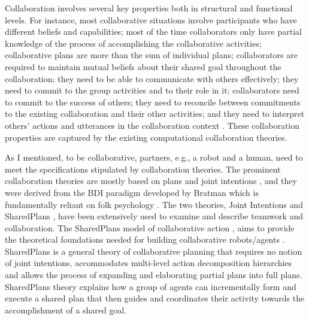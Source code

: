 \documentclass[a4paper, 10pt]{article}
\begin{document}
\begin{small}
Collaboration involves several key properties both in structural and functional
levels. For instance, most collaborative situations involve participants who
have different beliefs and capabilities; most of the time collaborators only
have partial knowledge of the process of accomplishing the collaborative
activities; collaborative plans are more than the sum of individual plans;
collaborators are required to maintain mutual beliefs about their shared goal
throughout the collaboration; they need to be able to communicate with others
effectively; they need to commit to the group activities and to their role in
it; collaborators need to commit to the success of others; they need to
reconcile between commitments to the existing collaboration and their other
activities; and they need to interpret others' actions and utterances in the
collaboration context \cite{grosz:mice-menus}. These collaboration properties
are captured by the existing computational collaboration theories.

As I mentioned, to be collaborative, partners, e.g., a robot and a human, need
to meet the specifications stipulated by collaboration theories. The prominent
collaboration theories are mostly based on plans and joint intentions
\cite{cohen:teamwork,grosz:plans-discourse,Litman:discourse-commonsense}, and
they were derived from the BDI paradigm developed by Bratman
\cite{bratman:intentions-plans} which is fundamentally reliant on folk
psychology \cite{ravenscroft:folk}. The two theories, Joint Intentions
\cite{cohen:teamwork} and SharedPlans \cite{grosz:plans-discourse}, have been
extensively used to examine and describe teamwork and collaboration. The
SharedPlans model of collaborative action \cite{grosz:planning-acting,
grosz:collaboration, grosz:plans-discourse}, aims to provide the theoretical
foundations needed for building collaborative robots/agents
\cite{grosz:collaborative-systems}. SharedPlans is a general theory of
collaborative planning that requires no notion of joint intentions, accommodates
multi-level action decomposition hierarchies and allows the process of expanding
and elaborating partial plans into full plans. SharedPlans theory explains how a
group of agents can incrementally form and execute a shared plan that then
guides and coordinates their activity towards the accomplishment of a shared
goal.


\end{small}
\end{document}
